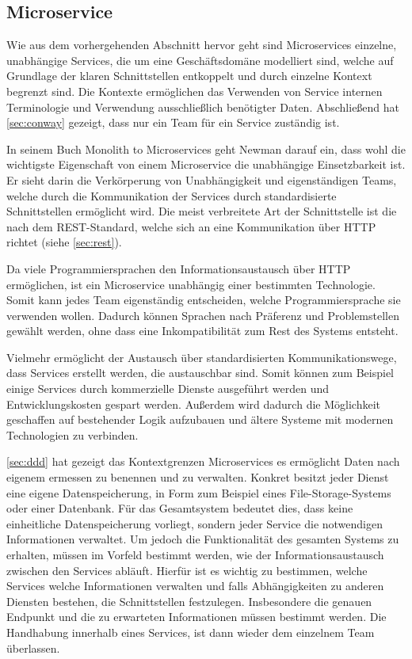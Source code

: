 \subsection{Microservice}

Wie aus dem vorhergehenden Abschnitt hervor geht sind Microservices einzelne, unabhängige Services, die um eine Geschäftsdomäne modelliert sind, welche auf Grundlage der klaren Schnittstellen entkoppelt und durch einzelne Kontext begrenzt sind. Die Kontexte ermöglichen das Verwenden von Service internen Terminologie und Verwendung ausschließlich benötigter Daten. Abschließend hat \cref{sec:conway} gezeigt, dass nur ein Team für ein Service zuständig ist.

In seinem Buch Monolith to Microservices geht Newman darauf ein, dass wohl die wichtigste Eigenschaft von einem Microservice die unabhängige Einsetzbarkeit ist. Er sieht darin die Verkörperung von Unabhängigkeit und eigenständigen Teams, welche durch die Kommunikation der Services durch standardisierte Schnittstellen ermöglicht wird. Die meist verbreitete Art der Schnittstelle ist die nach dem REST-Standard, welche sich an eine Kommunikation über HTTP richtet (siehe \cref{sec:rest}).

Da viele Programmiersprachen den Informationsaustausch über HTTP ermöglichen, ist ein Microservice unabhängig einer bestimmten Technologie. Somit kann jedes Team eigenständig entscheiden, welche Programmiersprache sie verwenden wollen. Dadurch können Sprachen nach Präferenz und Problemstellen gewählt werden, ohne dass eine Inkompatibilität zum Rest des Systems entsteht.

Vielmehr ermöglicht der Austausch über standardisierten Kommunikationswege, dass Services erstellt werden, die austauschbar sind. Somit können zum Beispiel einige Services durch kommerzielle Dienste ausgeführt werden und Entwicklungskosten gespart werden. Außerdem wird dadurch die Möglichkeit geschaffen auf bestehender Logik aufzubauen und ältere Systeme mit modernen Technologien zu verbinden.


\cref{sec:ddd} hat gezeigt das Kontextgrenzen Microservices es ermöglicht Daten nach eigenem ermessen zu benennen und zu verwalten. Konkret besitzt jeder Dienst eine eigene Datenspeicherung, in Form zum Beispiel eines File-Storage-Systems oder einer Datenbank. Für das Gesamtsystem bedeutet dies, dass keine einheitliche Datenspeicherung vorliegt, sondern jeder Service die notwendigen Informationen verwaltet. Um jedoch die Funktionalität des gesamten Systems zu erhalten, müssen im Vorfeld bestimmt werden, wie der Informationsaustausch zwischen den Services abläuft. Hierfür ist es wichtig zu bestimmen, welche Services welche Informationen verwalten und falls Abhängigkeiten zu anderen Diensten bestehen, die Schnittstellen festzulegen. Insbesondere die genauen Endpunkt und die zu erwarteten Informationen müssen bestimmt werden. Die Handhabung innerhalb eines Services, ist dann wieder dem einzelnem Team überlassen. 


